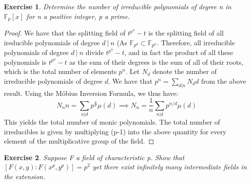 \documentclass{article}
\newtheorem{exercise}{Exercise}
\begin{document}
\begin{exercise}
  Determine the number of irreducible polynomials of degree n in $\mathbb{F}_{p}[x]$ for n a positive integer, p a prime. 
\end{exercise}

\begin{proof}
 We have that the splitting field of $t^{p^{n}}-t$ is the splitting field of all ireducible polynomials of degree $d \ | \ n$ (As $\mathbb{F}_{p^{d}}\subset \mathbb{F}_{p^{n}}$. Therefore, all irreducible polynomials of degree $d \ | \ n$ divide $t^{p^{n}}-t$, and in fact the product of all these polynomials is $t^{p^{n}}-t$ as the sum of their degrees is the sum of all of their roots, which is the total number of elements $p^{n}$. Let $N_{d}$ denote the number of irreducible polynomials of degree $d$. We have that $p^{n} = \sum_{d|n}N_{d}d$ from the above result. Using the M\"obius Inversion Formula, we thus have: \[N_{n}n = \sum_{n|d} p^{\frac{n}{d}}\mu(d) \implies N_{n} = \frac{1}{n}\sum_{n | d}p^{n/d}\mu(d)\]
This yields the total number of monic polynomials. The total number of irreducibles is given by multiplying (p-1) into the above quantity for every element of the multiplicative group of the field. 
\end{proof}

\newpage

\begin{exercise}
  Suppose F a field of characteristic p. Show that $[F(x,y):F(x^{p},y^{p})] = p^{2}$ yet there exist infinitely many intermediate fields in the extension.
\end{exercise}
\end{document}
